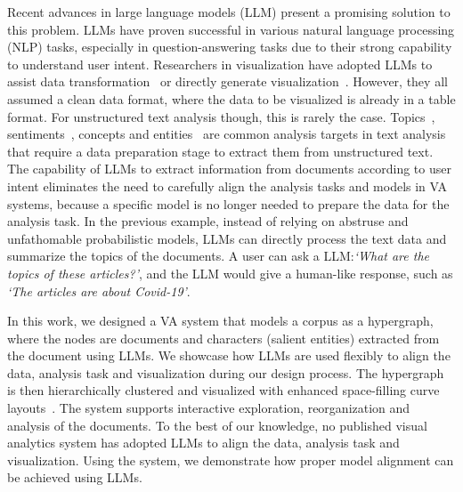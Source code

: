 Recent advances in large language models (LLM) present a promising solution to this problem.
LLMs have proven successful in various natural language processing (NLP) tasks, especially in question-answering tasks due to their strong capability to understand user intent.
Researchers in visualization have adopted LLMs to assist data transformation~\cite{wang2023dataformulator} or directly generate visualization~\cite{maddigan2023chat2vis}.
However, they all assumed a clean data format, where the data to be visualized is already in a table format. 
For unstructured text analysis though, this is rarely the case.
Topics~\cite{atzberger2023evaluatetopicmodel}, sentiments~\cite{beasley2021through}, concepts and entities~\cite{park2018conceptvector,cao2010facetatlas} are common analysis targets in text analysis that require a data preparation stage to extract them from unstructured text.
The capability of LLMs to extract information from documents according to user intent eliminates the need to carefully align the analysis tasks and models in VA systems,
because a specific model is no longer needed to prepare the data for the analysis task.
In the previous example, instead of relying on abstruse and unfathomable probabilistic models, LLMs can directly process the text data and summarize the topics of the documents.
A user can ask a LLM:\@ \textit{`What are the topics of these articles?'}, and the LLM would give a human-like response, such as \textit{`The articles are about Covid-19'}.

In this work, we designed a VA system that models a corpus as a hypergraph, where the nodes are documents and characters (salient entities) extracted from the document using LLMs.
We showcase how LLMs are used flexibly to align the data, analysis task and visualization during our design process.
The hypergraph is then hierarchically clustered and visualized with enhanced space-filling curve layouts~\cite{muelder2008sfc}.
The system supports interactive exploration, reorganization and analysis of the documents.
To the best of our knowledge, no published visual analytics system has adopted LLMs to align the data, analysis task and visualization.
Using the system, we demonstrate how proper model alignment can be achieved using LLMs.

